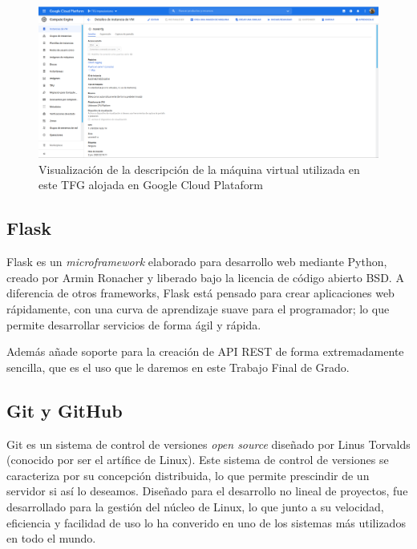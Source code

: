 \documentclass[../main.tex]{subfiles}
\begin{document}
\begin{figure}[h!]
    \centering
    \includegraphics[width=1\textwidth]{imagenes/gcp_mv.png}
    \caption{Visualización de la descripción de la máquina virtual utilizada en este TFG alojada en Google Cloud Plataform}
    \label{fig:gcp_mv}
\end{figure}

\subsection{Flask}
Flask es un \textit{microframework} elaborado para desarrollo web mediante Python, creado por Armin Ronacher y liberado bajo la licencia de código abierto BSD. A diferencia de otros frameworks, Flask está pensado para crear aplicaciones web rápidamente, con una curva de aprendizaje suave para el programador; lo que permite desarrollar servicios de forma ágil y rápida.
\newline

Además añade soporte para la creación de API REST de forma extremadamente sencilla, que es el uso que le daremos en este Trabajo Final de Grado.

\subsection{Git y GitHub}

Git es un sistema de control de versiones \textit{open source} diseñado por Linus Torvalds (conocido por ser el artífice de Linux). Este sistema de control de versiones se caracteriza por su concepción distribuida, lo que permite prescindir de un servidor si así lo deseamos. Diseñado para el desarrollo no lineal de proyectos, fue desarrollado para la gestión del núcleo de Linux, lo que junto a su velocidad, eficiencia y facilidad de uso lo ha converido en uno de los sistemas más utilizados en todo el mundo. \newline
\end{document}
